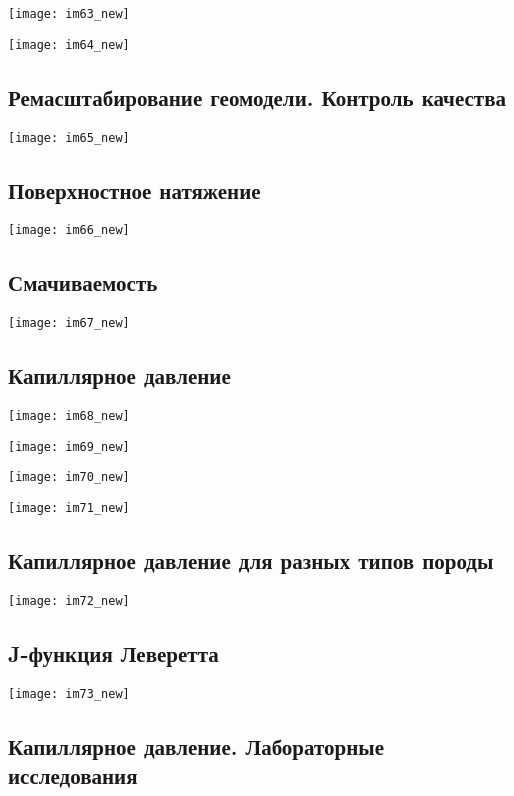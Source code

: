 \documentclass[main.tex]{subfiles}
\begin{document}
\texttt{[image: im63\_new]}

\texttt{[image: im64\_new]}

\subsection{Ремасштабирование геомодели. Контроль качества}

\texttt{[image: im65\_new]}

\subsection{Поверхностное натяжение}

\texttt{[image: im66\_new]}

\subsection{Смачиваемость}

\texttt{[image: im67\_new]}

\subsection{Капиллярное давление}

\texttt{[image: im68\_new]}

\texttt{[image: im69\_new]}

\texttt{[image: im70\_new]}

\texttt{[image: im71\_new]}

\subsection{Капиллярное давление для разных типов породы}

\texttt{[image: im72\_new]}

\subsection{J-функция Леверетта}

\texttt{[image: im73\_new]}

\subsection{Капиллярное давление. Лабораторные исследования}
\end{document}
